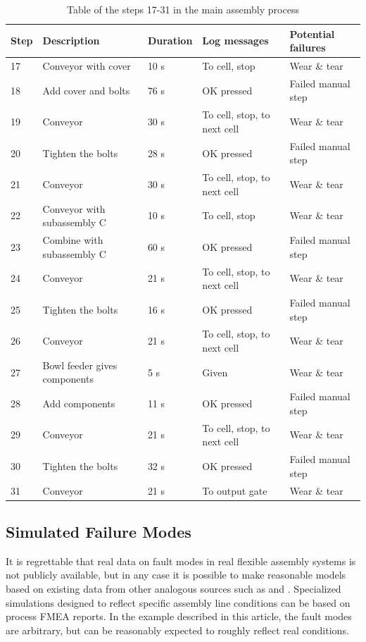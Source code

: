 \documentclass[journal]{IEEEtran}
\begin{document}
\begin{table}[!t]
\renewcommand{\arraystretch}{1.3}
\caption{Table of the steps 17-31 in the main assembly process}
\label{mainsteps2}
\centering
\begin{tabular}{|p{5mm}|p{20mm}|p{10mm}|p{15mm}|p{15mm}|}
\hline
Step & Description & Duration & Log messages & Potential failures \\
\hline
\hline
17 & Conveyor with cover & 10 s & To cell, stop & Wear \& tear \\
\hline
18 & Add cover and bolts & 76 s & OK pressed & Failed manual step \\
\hline
19 & Conveyor & 30 s & To cell, stop, to next cell & Wear \& tear \\
\hline
20 & Tighten the bolts & 28 s & OK pressed & Failed manual step \\
\hline
21 & Conveyor & 30 s & To cell, stop, to next cell & Wear \& tear \\
\hline
22 & Conveyor with subassembly C & 10 s & To cell, stop & Wear \& tear \\
\hline
23 & Combine with subassembly C & 60 s & OK pressed & Failed manual step \\
\hline
24 & Conveyor & 21 s & To cell, stop, to next cell & Wear \& tear \\
\hline
25 & Tighten the bolts & 16 s & OK pressed & Failed manual step \\
\hline
26 & Conveyor & 21 s & To cell, stop, to next cell & Wear \& tear \\
\hline
27 & Bowl feeder gives components & 5 s & Given & Wear \& tear \\
\hline
28 & Add components & 11 s & OK pressed & Failed manual step \\
\hline
29 & Conveyor & 21 s & To cell, stop, to next cell & Wear \& tear \\
\hline
30 & Tighten the bolts & 32 s & OK pressed & Failed manual step \\
\hline
31 & Conveyor & 21 s & To output gate & Wear \& tear \\
\hline
\end{tabular}
\end{table}

\subsection{Simulated Failure Modes}
It is regrettable that real data on fault modes in real flexible assembly systems is not publicly available, but in any case it is possible to make reasonable
models based on existing data from other analogous sources such as \cite{nasaames} and \cite{tsarouhas2009classification}. Specialized simulations designed
to reflect specific assembly line conditions can be based on process FMEA reports. In the example described in this article, the fault modes are arbitrary, but 
can be reasonably expected to roughly reflect real conditions.
\end{document}
